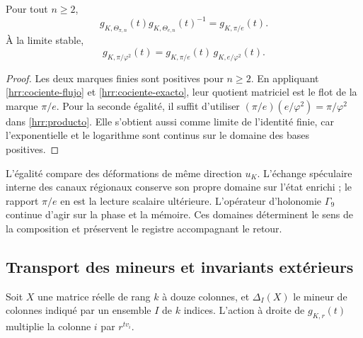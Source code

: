 \begin{corollary}
\label{hrr:composicion}
Pour tout \(n\geq2\),
\begin{equation}
 g_{K,\Theta_{\pi,n}}(t)
 g_{K,\Theta_{e,n}}(t)^{-1}
 =g_{K,\pi/e}(t).
 \label{hrr:composicion-finita}
\end{equation}
À la limite stable,
\begin{equation}
 g_{K,\pi/\varphi^2}(t)
 =g_{K,\pi/e}(t)\,g_{K,e/\varphi^2}(t).
 \label{hrr:composicion-limite}
\end{equation}
\end{corollary}
\begin{proof}
Les deux marques finies sont positives pour \(n\geq2\). En appliquant \eqref{hrr:cociente-flujo} et \eqref{hrr:cociente-exacto}, leur quotient matriciel est le flot de la marque \(\pi/e\). Pour la seconde égalité, il suffit d’utiliser \((\pi/e)(e/\varphi^2)=\pi/\varphi^2\) dans \eqref{hrr:producto}. Elle s’obtient aussi comme limite de l’identité finie, car l’exponentielle et le logarithme sont continus sur le domaine des bases positives.
\end{proof}

L’égalité compare des déformations de même direction \(u_K\). L’échange spéculaire interne des canaux régionaux conserve son propre domaine sur l’état enrichi ; le rapport \(\pi/e\) en est la lecture scalaire ultérieure. L’opérateur d’holonomie \(\Gamma_9\) continue d’agir sur la phase et la mémoire. Ces domaines déterminent le sens de la composition et préservent le registre accompagnant le retour.

\subsection{Transport des mineurs et invariants extérieurs}

Soit \(X\) une matrice réelle de rang \(k\) à douze colonnes, et \(\Delta_I(X)\) le mineur de colonnes indiqué par un ensemble \(I\) de \(k\) indices. L’action à droite de \(g_{K,r}(t)\) multiplie la colonne \(i\) par \(r^{tv_i}\).

